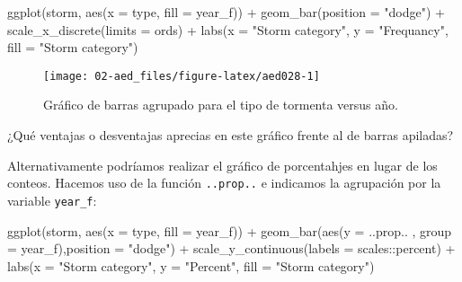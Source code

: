 \documentclass[
]{book}
\newenvironment{Shaded}{\begin{snugshade}}{\end{snugshade}}
\newcommand{\AttributeTok}[1]{\textcolor[rgb]{0.77,0.63,0.00}{#1}}
\newcommand{\FunctionTok}[1]{\textcolor[rgb]{0.00,0.00,0.00}{#1}}
\newcommand{\NormalTok}[1]{#1}
\newcommand{\SpecialCharTok}[1]{\textcolor[rgb]{0.00,0.00,0.00}{#1}}
\newcommand{\StringTok}[1]{\textcolor[rgb]{0.31,0.60,0.02}{#1}}
\begin{document}
\begin{Shaded}
\begin{Highlighting}[]
\FunctionTok{ggplot}\NormalTok{(storm, }\FunctionTok{aes}\NormalTok{(}\AttributeTok{x =}\NormalTok{ type, }\AttributeTok{fill =}\NormalTok{ year\_f)) }\SpecialCharTok{+} 
  \FunctionTok{geom\_bar}\NormalTok{(}\AttributeTok{position =} \StringTok{"dodge"}\NormalTok{) }\SpecialCharTok{+} 
  \FunctionTok{scale\_x\_discrete}\NormalTok{(}\AttributeTok{limits =}\NormalTok{ ords) }\SpecialCharTok{+}
  \FunctionTok{labs}\NormalTok{(}\AttributeTok{x =} \StringTok{"Storm category"}\NormalTok{, }\AttributeTok{y =} \StringTok{"Frequancy"}\NormalTok{, }\AttributeTok{fill =} \StringTok{"Storm category"}\NormalTok{)}
\end{Highlighting}
\end{Shaded}

\begin{figure}

{\centering \texttt{[image: 02-aed\_files/figure-latex/aed028-1]} 

}

\caption{Gráfico de barras agrupado para el tipo de tormenta versus año.}\label{fig:aed028}
\end{figure}

¿Qué ventajas o desventajas aprecias en este gráfico frente al de barras apiladas?

Alternativamente podríamos realizar el gráfico de porcentahjes en lugar de los conteos. Hacemos uso de la función \texttt{..prop..} e indicamos la agrupación por la variable \texttt{year\_f}:

\begin{Shaded}
\begin{Highlighting}[]
\FunctionTok{ggplot}\NormalTok{(storm, }\FunctionTok{aes}\NormalTok{(}\AttributeTok{x =}\NormalTok{ type, }\AttributeTok{fill =}\NormalTok{ year\_f)) }\SpecialCharTok{+} 
  \FunctionTok{geom\_bar}\NormalTok{(}\FunctionTok{aes}\NormalTok{(}\AttributeTok{y =}\NormalTok{ ..prop.. , }\AttributeTok{group =}\NormalTok{ year\_f),}\AttributeTok{position =} \StringTok{"dodge"}\NormalTok{) }\SpecialCharTok{+} 
  \FunctionTok{scale\_y\_continuous}\NormalTok{(}\AttributeTok{labels =}\NormalTok{ scales}\SpecialCharTok{::}\NormalTok{percent) }\SpecialCharTok{+}
  \FunctionTok{labs}\NormalTok{(}\AttributeTok{x =} \StringTok{"Storm category"}\NormalTok{, }\AttributeTok{y =} \StringTok{"Percent"}\NormalTok{, }\AttributeTok{fill =} \StringTok{"Storm category"}\NormalTok{)}
\end{Highlighting}
\end{Shaded}
\end{document}
